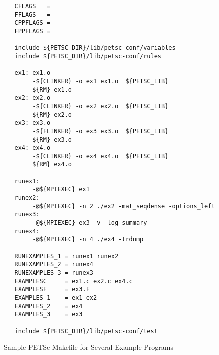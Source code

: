 {{\begin{figure}[H]
{\small
\begin{verbatim}
   CFLAGS   =
   FFLAGS   =
   CPPFLAGS =
   FPPFLAGS =

   include ${PETSC_DIR}/lib/petsc-conf/variables
   include ${PETSC_DIR}/lib/petsc-conf/rules

   ex1: ex1.o
        -${CLINKER} -o ex1 ex1.o  ${PETSC_LIB}
        ${RM} ex1.o
   ex2: ex2.o
        -${CLINKER} -o ex2 ex2.o  ${PETSC_LIB}
        ${RM} ex2.o
   ex3: ex3.o
        -${FLINKER} -o ex3 ex3.o  ${PETSC_LIB}
        ${RM} ex3.o
   ex4: ex4.o
        -${CLINKER} -o ex4 ex4.o  ${PETSC_LIB}
        ${RM} ex4.o

   runex1:
        -@${MPIEXEC} ex1
   runex2:
        -@${MPIEXEC} -n 2 ./ex2 -mat_seqdense -options_left
   runex3:
        -@${MPIEXEC} ex3 -v -log_summary
   runex4:
        -@${MPIEXEC} -n 4 ./ex4 -trdump

   RUNEXAMPLES_1 = runex1 runex2
   RUNEXAMPLES_2 = runex4
   RUNEXAMPLES_3 = runex3
   EXAMPLESC     = ex1.c ex2.c ex4.c
   EXAMPLESF     = ex3.F
   EXAMPLES_1    = ex1 ex2
   EXAMPLES_2    = ex4
   EXAMPLES_3    = ex3

   include ${PETSC_DIR}/lib/petsc-conf/test
\end{verbatim}
}
\caption{Sample PETSc Makefile for Several Example Programs}
\label{fig_make2}
\end{figure}

}}
